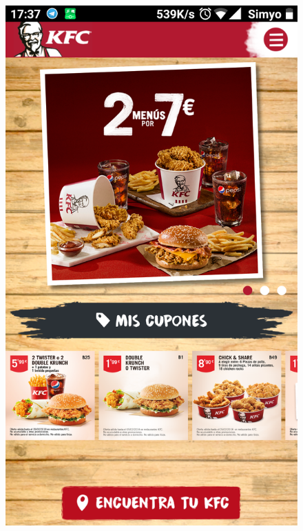 \documentclass[twoside]{report}
\begin{document}
\begin{figure}[H]
\begin{center}
\includegraphics[scale=0.10]{images/restaurantes/kfc0.png}

\end{center}
\end{figure}
\end{document}
